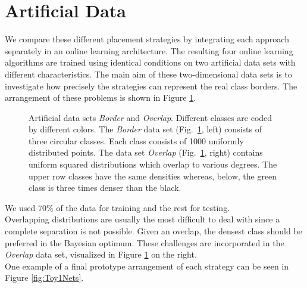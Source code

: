 \documentclass[conference]{IEEEtran}
\begin{document}
\section{Artificial Data}
We compare these different placement strategies by integrating each approach separately in
an online learning architecture. 
The resulting four online learning algorithms are trained using identical conditions
on two artificial data sets with different characteristics. 
The main aim of these two-dimensional data sets is to investigate how precisely the strategies can represent the real class borders.
The arrangement of these problems is shown in Figure \ref{Borders}.  
\begin{figure}
\centering
\caption{Artificial data sets \textit{Border} and \textit{Overlap}. Different classes are coded by different colors. 
The \textit{Border} data set (Fig.~\ref{Borders}, left) consists of three circular classes. Each class consists
of 1000 uniformly distributed points.
The data set \textit{Overlap} (Fig.~\ref{Borders}, right) contains uniform squared distributions which overlap to various degrees. The upper row classes have the same densities whereas, below,
the green class is three times denser than the black.}
\label{Borders}
\end{figure}
We used $70\%$ of the data for training and the rest for testing.\\
Overlapping distributions are usually the most difficult to deal with since a complete separation is not possible.
Given an overlap, the densest class should be preferred in the Bayesian optimum. These challenges are incorporated in the \textit{Overlap} data set, visualized in Figure \ref{Borders} on the right.\\
One example of a final prototype arrangement of each strategy can be seen in Figure \ref{fig:Toy1Nets}.
\end{document}
